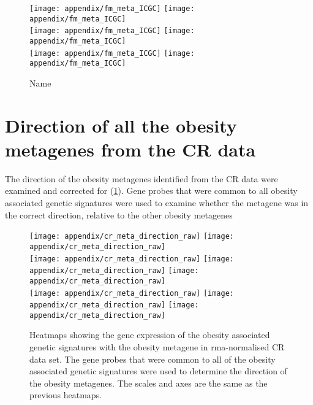 \begin{appendices}
	\begin{figure}[htpb]
		\ContinuedFloat
		\captionsetup{list=off,format=cont}
		\centering
		\texttt{[image: appendix/fm\_meta\_ICGC]}
		\hfill
		\texttt{[image: appendix/fm\_meta\_ICGC]}\\
		\texttt{[image: appendix/fm\_meta\_ICGC]}
		\hfill
		\texttt{[image: appendix/fm\_meta\_ICGC]}\\
		\texttt{[image: appendix/fm\_meta\_ICGC]}
		\hfill
		\texttt{[image: appendix/fm\_meta\_ICGC]}\\
		\caption{Name}
	\end{figure}

	\section{Direction of all the obesity metagenes from the CR data}
	\label{sec:direction_of_all_the_obesity_metagenes_from_the_cr_data}

	The direction of the obesity metagenes identified from the CR data were examined and corrected for (\cref{fig:crob_meta_direction}).
	Gene probes that were common to all obesity associated genetic signatures were used to examine whether the metagene was in the correct direction, relative to the other obesity metagenes

	\begin{figure}[htpb]
		\centering
		\texttt{[image: appendix/cr\_meta\_direction\_raw]}
		\texttt{[image: appendix/cr\_meta\_direction\_raw]}\\
		\texttt{[image: appendix/cr\_meta\_direction\_raw]}
		\texttt{[image: appendix/cr\_meta\_direction\_raw]}
		\texttt{[image: appendix/cr\_meta\_direction\_raw]}\\
		\texttt{[image: appendix/cr\_meta\_direction\_raw]}
		\texttt{[image: appendix/cr\_meta\_direction\_raw]}
		\texttt{[image: appendix/cr\_meta\_direction\_raw]}\\
		\caption[Directionality of the obesity metagenes in the CR data]{Heatmaps showing the gene expression of the obesity associated genetic signatures with the obesity metagene in \gls{rma}-normalised CR data set.
		The gene probes that were common to all of the obesity associated genetic signatures were used to determine the direction of the obesity metagenes.
		The scales and axes are the same as the previous heatmaps.
		}
		\label{fig:crob_meta_direction}
	\end{figure}


\end{appendices}
